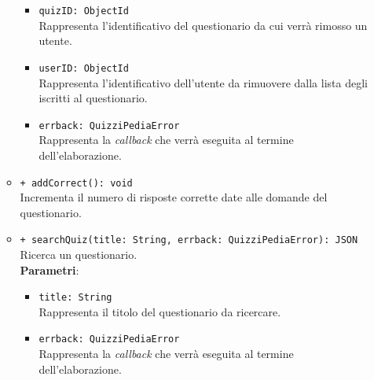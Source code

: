 \begin{itemize}
\begin{itemize}
\begin{itemize}
				\item \texttt{quizID: ObjectId}\\
				Rappresenta l'identificativo del questionario da cui verrà rimosso un utente.
				\item \texttt{userID: ObjectId}\\
				Rappresenta l'identificativo dell'utente da rimuovere dalla lista degli iscritti al questionario.
				\item \texttt{errback: QuizziPediaError}\\
				Rappresenta la \textit{callback} che verrà eseguita al termine dell'elaborazione.
			\end{itemize}
			\item \texttt{+ addCorrect(): void}\\
			Incrementa il numero di risposte corrette date alle domande del questionario.\\
			\item \texttt{+ searchQuiz(title: String, errback: QuizziPediaError): JSON}\\
			Ricerca un questionario.\\
			\textbf{Parametri}:
			\begin{itemize}
				\item \texttt{title: String}\\
				Rappresenta il titolo del questionario da ricercare.
				\item \texttt{errback: QuizziPediaError}\\
				Rappresenta la \textit{callback} che verrà eseguita al termine dell'elaborazione.
			\end{itemize}
		\end{itemize}
\end{itemize}